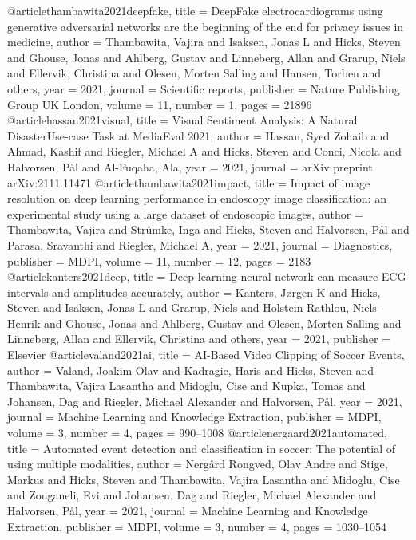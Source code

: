 @article{thambawita2021deepfake,
	title = {DeepFake electrocardiograms using generative adversarial networks are the beginning of the end for privacy issues in medicine},
	author = {Thambawita, Vajira and Isaksen, Jonas L and Hicks, Steven and Ghouse, Jonas and Ahlberg, Gustav and Linneberg, Allan and Grarup, Niels and Ellervik, Christina and Olesen, Morten Salling and Hansen, Torben and others},
	year = 2021,
	journal = {Scientific reports},
	publisher = {Nature Publishing Group UK London},
	volume = 11,
	number = 1,
	pages = 21896
}
@article{hassan2021visual,
	title = {Visual Sentiment Analysis: A Natural DisasterUse-case Task at MediaEval 2021},
	author = {Hassan, Syed Zohaib and Ahmad, Kashif and Riegler, Michael A and Hicks, Steven and Conci, Nicola and Halvorsen, P{\aa}l and Al-Fuqaha, Ala},
	year = 2021,
	journal = {arXiv preprint arXiv:2111.11471}
}
@article{thambawita2021impact,
	title = {Impact of image resolution on deep learning performance in endoscopy image classification: an experimental study using a large dataset of endoscopic images},
	author = {Thambawita, Vajira and Str{\"u}mke, Inga and Hicks, Steven and Halvorsen, P{\aa}l and Parasa, Sravanthi and Riegler, Michael A},
	year = 2021,
	journal = {Diagnostics},
	publisher = {MDPI},
	volume = 11,
	number = 12,
	pages = 2183
}
@article{kanters2021deep,
	title = {Deep learning neural network can measure ECG intervals and amplitudes accurately},
	author = {Kanters, J{\o}rgen K and Hicks, Steven and Isaksen, Jonas L and Grarup, Niels and Holstein-Rathlou, Niels-Henrik and Ghouse, Jonas and Ahlberg, Gustav and Olesen, Morten Salling and Linneberg, Allan and Ellervik, Christina and others},
	year = 2021,
	publisher = {Elsevier}
}
@article{valand2021ai,
	title = {AI-Based Video Clipping of Soccer Events},
	author = {Valand, Joakim Olav and Kadragic, Haris and Hicks, Steven and Thambawita, Vajira Lasantha and Midoglu, Cise and Kupka, Tomas and Johansen, Dag and Riegler, Michael Alexander and Halvorsen, P{\aa}l},
	year = 2021,
	journal = {Machine Learning and Knowledge Extraction},
	publisher = {MDPI},
	volume = 3,
	number = 4,
	pages = {990--1008}
}
@article{nergaard2021automated,
	title = {Automated event detection and classification in soccer: The potential of using multiple modalities},
	author = {Nerg{\aa}rd Rongved, Olav Andre and Stige, Markus and Hicks, Steven and Thambawita, Vajira Lasantha and Midoglu, Cise and Zouganeli, Evi and Johansen, Dag and Riegler, Michael Alexander and Halvorsen, P{\aa}l},
	year = 2021,
	journal = {Machine Learning and Knowledge Extraction},
	publisher = {MDPI},
	volume = 3,
	number = 4,
	pages = {1030--1054}
}
